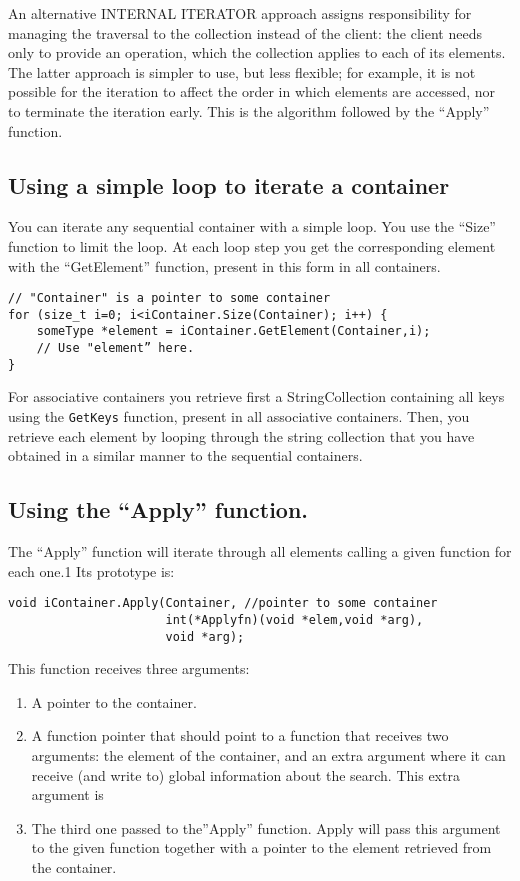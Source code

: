 \documentclass[12pt,a4paper]{memoir} %
\begin{document}
An alternative INTERNAL ITERATOR approach assigns responsibility for managing the traversal to the collection instead of the client: the client needs only to provide an operation, which the collection applies to each of its elements. The latter approach is simpler to use, but less flexible; for example, it is not possible for the iteration to affect the order in which elements are accessed, nor to terminate the iteration early. This is the algorithm followed by the “Apply” function.

\subsection{Using a simple loop to iterate a container}

You can iterate any sequential container with a simple loop. You use the “Size” function to limit the loop. At each loop step you get the corresponding element with the “GetElement” function, present in this form in all containers.
\begin{verbatim}
// "Container" is a pointer to some container
for (size_t i=0; i<iContainer.Size(Container); i++) {
    someType *element = iContainer.GetElement(Container,i);
    // Use "element” here.
}
\end{verbatim}
For associative containers you retrieve first a StringCollection containing all keys using the \texttt{GetKeys} function, present in all associative containers. Then, you retrieve each element by looping through the string collection that you have obtained in a similar manner to the sequential containers. 

\subsection{Using the “Apply” function.}
The “Apply” function will iterate through all elements calling a given function for each one.1 Its prototype is:
\begin{verbatim}
void iContainer.Apply(Container, //pointer to some container
                      int(*Applyfn)(void *elem,void *arg),
                      void *arg);
\end{verbatim}
This function receives three arguments:
\begin{enumerate}
\item A pointer to the container.
\item A function pointer that should point to a function that receives two arguments: the element of the container, and an extra argument where it can receive (and write to) global information about the search.  This extra argument is 
\item The third one passed to the”Apply” function. Apply will pass this argument to the given function together with a pointer to the element retrieved from the container.
\end{enumerate}
\end{document}
